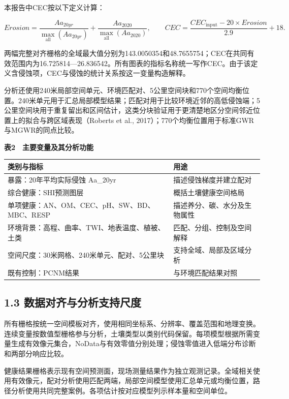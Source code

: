 \documentclass[
  11pt,
  a4paper,
]{ctexart}
\begin{document}
本报告中CEC按以下定义计算：

\[
Erosion=\frac{Aa_{20yr}}{\max_{\mathrm{all}}(Aa_{20yr})}+
\frac{Aa_{2020}}{\max_{\mathrm{all}}(Aa_{2020})},\qquad
CEC=\frac{CEC_{\mathrm{input}}-20\times Erosion}{2.9}+18.
\]

两幅完整对齐栅格的全域最大值分别为143.0050354和48.7655754；CEC在共同有效范围内为16.725814---26.836542。所有图表的指标名称统一写作CEC。由于该定义含侵蚀项，CEC与侵蚀的统计关系按这一变量构造解释。

分析还使用240米局部空间单元、环境匹配对、5公里空间块和770个空间均衡位置。240米单元用于汇总局部模型结果；匹配对用于比较环境近邻的高低侵蚀端；5公里空间块用于重复留出和区间估计，这类分块验证用于更清楚地区分空间邻近位置上的拟合与跨区域表现（Roberts
et al., 2017）；770个均衡位置用于标准GWR与MGWR的同点比较。

\textbf{表2　主要变量及其分析功能}

\begin{longtable}[]{@{}ll@{}}
\toprule
类别与指标 & 用途 \\
\midrule
\endhead
暴露：20年平均实际侵蚀 Aa\_20yr & 描述侵蚀梯度并建立配对 \\
综合健康：SHI预测图层 & 概括土壤健康空间格局 \\
单项健康：AN、OM、CEC、pH、SW、BD、MBC、RESP &
描述养分、碳、水分及生物属性 \\
环境背景：高程、曲率、TWI、地表温度、植被、土类 &
匹配、分组、控制及空间解释 \\
空间尺度：30米网格、240米单元、配对、5公里块 &
支持全域、局部及区域分析 \\
既有控制：PCNM结果 & 与环境匹配结果对照 \\
\bottomrule
\end{longtable}

\hypertarget{ux6570ux636eux5bf9ux9f50ux4e0eux5206ux6790ux652fux6301ux5c3aux5ea6}{%
\subsection{1.3
数据对齐与分析支持尺度}\label{ux6570ux636eux5bf9ux9f50ux4e0eux5206ux6790ux652fux6301ux5c3aux5ea6}}

所有栅格按统一空间模板对齐，使用相同坐标系、分辨率、覆盖范围和地理变换。连续变量按数值型栅格参与分析，土壤类型以类别代码保留。每项模型根据所需变量生成有效像元集合，NoData与有效零值分别处理；侵蚀零值进入低端分布诊断和两部分响应比较。

健康结果栅格表示现有空间预测面，现场测量结果作为独立观测记录。全域相关使用有效像元，配对分析使用匹配两端，局部空间模型使用汇总单元或均衡位置，路径分析使用共同完整案例。各项估计按对应模型列示样本量和空间单位。
\end{document}
